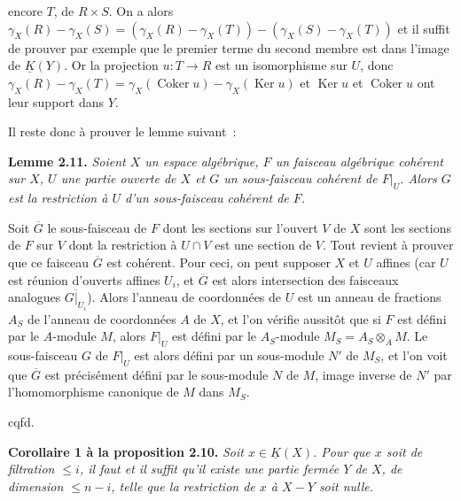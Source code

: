 encore $T$, de $R\times S$. On a alors $\gamma_X(R)-\gamma_X(S)=(\gamma_X(R)-\gamma_X(T))-(\gamma_X(S)-\gamma_X(T))$ et il suffit de prouver par exemple que le premier terme du second membre est dans l'image de $\underline K(Y)$. Or la projection $u:T\longrightarrow R$ est un isomorphisme sur $U$, donc $\gamma_X(R)-\gamma_X(T)=\gamma_X(\operatorname{Coker}u)-\gamma_X(\operatorname{Ker}u)$ et $\operatorname{Ker}u$ et $\operatorname{Coker}u$ ont leur support dans $Y$.

Il reste donc à prouver le lemme suivant~:

\textbf{Lemme 2.11.} \emph{Soient $X$ un espace algébrique, $F$ un faisceau algébrique cohérent sur $X$, $U$ une partie ouverte de $X$ et $G$ un sous-faisceau cohérent de $F|_U$. Alors $G$ est la restriction à $U$ d'un sous-faisceau cohérent de $F$.}

Soit $\overline G$ le sous-faisceau de $F$ dont les sections sur l'ouvert $V$ de $X$ sont les sections de $F$ sur $V$ dont la restriction à $U\cap V$ est une section de $V$. Tout revient à prouver que ce faisceau $\overline G$ est cohérent. Pour ceci, on peut supposer $X$ et $U$ affines (car $U$ est réunion d'ouverts affines $U_i$, et $\overline G$ est alors intersection des faisceaux analogues $\overline{G|_{U_i}}$). Alors l'anneau de coordonnées de $U$ est un anneau de fractions $A_S$ de l'anneau de coordonnées $A$ de $X$, et l'on vérifie aussitôt que si $F$ est défini par le $A$-module $M$, alors $F|_U$ est défini par le $A_S$-module $M_S=A_S\otimes_A M$. Le sous-faisceau $G$ de $F|_U$ est alors défini par un sous-module $N'$ de $M_S$, et l'on voit que $\overline G$ est précisément défini par le sous-module $N$ de $M$, image inverse de $N'$ par l'homomorphisme canonique de $M$ dans $M_S$.
\begin{flushright}cqfd.\end{flushright}

\textbf{Corollaire 1 à la proposition 2.10.} \emph{Soit $x\in\underline K(X)$. Pour que $x$ soit de filtration $\leq i$, il faut et il suffit qu'il existe une partie fermée $Y$ de $X$, de dimension $\leq n-i$, telle que la restriction de $x$ à $X-Y$ soit nulle.}

